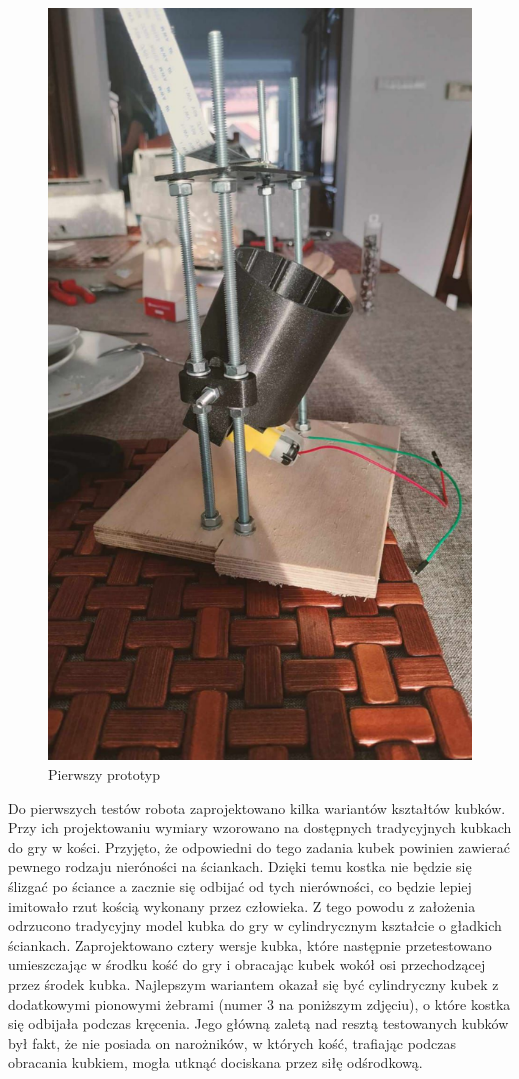 \begin{figure}[H]
    \centering
    \includegraphics[width=0.25\linewidth, trim={35mm 75mm 35mm 30mm}, clip]{chapters/03-praca-wlasna/figures/pierwszy}
    \caption{\label{fig:pierwszy}Pierwszy prototyp}
\end{figure}

Do pierwszych testów robota zaprojektowano kilka wariantów kształtów kubków. Przy ich projektowaniu wymiary wzorowano na dostępnych tradycyjnych kubkach do gry w kości.
Przyjęto, że odpowiedni do tego zadania kubek powinien
zawierać pewnego rodzaju nieróności na ściankach. Dzięki temu kostka nie będzie się ślizgać po ściance a zacznie się odbijać od tych nierówności, co 
będzie lepiej imitowało rzut kością wykonany przez człowieka. Z tego powodu z założenia odrzucono tradycyjny model kubka do gry w cylindrycznym kształcie 
o gładkich ściankach. Zaprojektowano cztery wersje kubka, które następnie przetestowano umieszczając w środku kość do gry i obracając kubek wokół osi przechodzącej przez środek kubka.
Najlepszym wariantem okazał się być cylindryczny kubek z dodatkowymi pionowymi żebrami (numer 3 na poniższym zdjęciu), o które kostka się odbijała podczas kręcenia. Jego główną zaletą
nad resztą testowanych kubków był fakt, że nie posiada on narożników, w których kość, trafiając podczas obracania kubkiem, mogła utknąć dociskana przez 
siłę odśrodkową.

